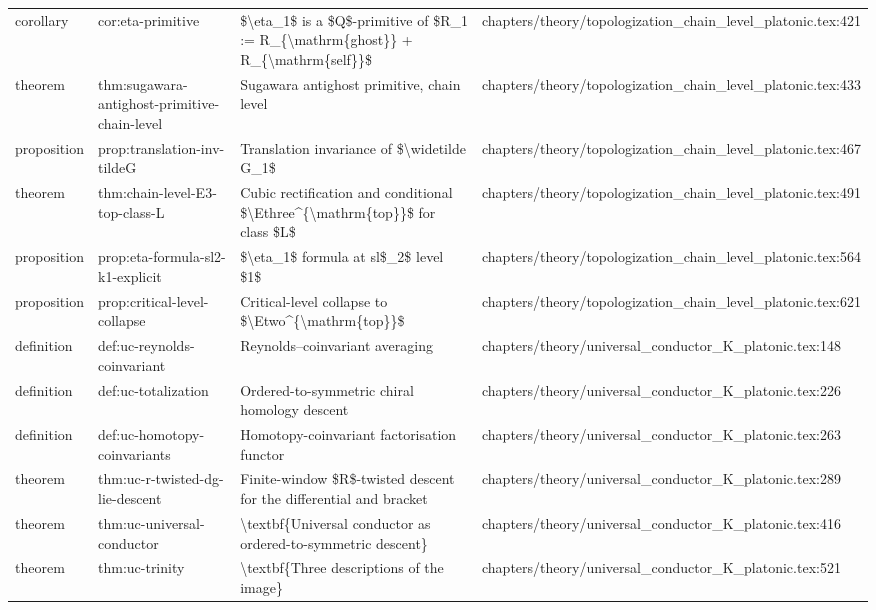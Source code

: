 \documentclass[11pt]{article}
\begin{document}
\begin{longtable}{L{0.10\textwidth}L{0.26\textwidth}L{0.42\textwidth}L{0.22\textwidth}}
corollary & cor:eta-primitive & \$\textbackslash{}eta\_1\$ is a \$Q\$-primitive of \$R\_1 := R\_\{\textbackslash{}mathrm\{ghost\}\} + R\_\{\textbackslash{}mathrm\{self\}\}\$ & chapters/theory/topologization\_chain\_level\_platonic.tex:421\\
theorem & thm:sugawara-antighost-primitive-chain-level & Sugawara antighost primitive, chain level & chapters/theory/topologization\_chain\_level\_platonic.tex:433\\
proposition & prop:translation-inv-tildeG & Translation invariance of \$\textbackslash{}widetilde G\_1\$ & chapters/theory/topologization\_chain\_level\_platonic.tex:467\\
theorem & thm:chain-level-E3-top-class-L & Cubic rectification and cond{}itional \$\textbackslash{}Ethree\textasciicircum{}\{\textbackslash{}mathrm\{top\}\}\$ for class \$L\$ & chapters/theory/topologization\_chain\_level\_platonic.tex:491\\
proposition & prop:eta-formula-sl2-k1-explicit & \$\textbackslash{}eta\_1\$ formula at sl\$\_2\$ level \$1\$ & chapters/theory/topologization\_chain\_level\_platonic.tex:564\\
proposition & prop:critical-level-collapse & Critical-level collapse to \$\textbackslash{}Etwo\textasciicircum{}\{\textbackslash{}mathrm\{top\}\}\$ & chapters/theory/topologization\_chain\_level\_platonic.tex:621\\
definition & def:uc-reynolds-coinvariant & Reynolds--coinvariant averaging & chapters/theory/universal\_conductor\_K\_platonic.tex:148\\
definition & def:uc-totalization & Ordered-to-symmetric chiral homology descent & chapters/theory/universal\_conductor\_K\_platonic.tex:226\\
definition & def:uc-homotopy-coinvariants & Homotopy-coinvariant factorisation functor & chapters/theory/universal\_conductor\_K\_platonic.tex:263\\
theorem & thm:uc-r-twisted-dg-lie-descent & Finite-window \$R\$-twisted descent for the differential and bracket & chapters/theory/universal\_conductor\_K\_platonic.tex:289\\
theorem & thm:uc-universal-conductor & \textbackslash{}textbf\{Universal conductor as ordered-to-symmetric descent\} & chapters/theory/universal\_conductor\_K\_platonic.tex:416\\
theorem & thm:uc-trinity & \textbackslash{}textbf\{Three descriptions of the image\} & chapters/theory/universal\_conductor\_K\_platonic.tex:521\\

\end{longtable}
\end{document}
